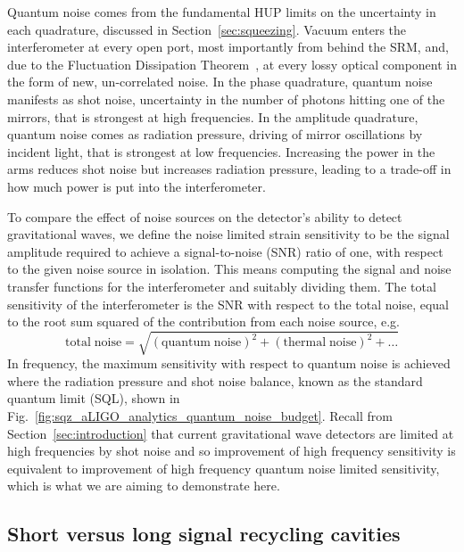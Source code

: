 \documentclass[aps,pra,superscriptaddress,reprint,nofootinbib]{revtex4-1}
\begin{document}
Quantum noise comes from the fundamental HUP limits on the uncertainty in each quadrature, discussed in Section~\ref{sec:squeezing}. Vacuum enters the interferometer at every open port, most importantly from behind the SRM, and, due to the Fluctuation Dissipation Theorem~\cite{Danilishin_2012}, at every lossy optical component in the form of new, un-correlated noise. In the phase quadrature, quantum noise manifests as shot noise, uncertainty in the number of photons hitting one of the mirrors, that is strongest at high frequencies. In the amplitude quadrature, quantum noise comes as radiation pressure, driving of mirror oscillations by incident light, that is strongest at low frequencies. Increasing the power in the arms reduces shot noise but increases radiation pressure, leading to a trade-off in how much power is put into the interferometer.


To compare the effect of noise sources on the detector’s ability to detect gravitational waves, we define the noise limited strain sensitivity to be the signal amplitude required to achieve a signal-to-noise (SNR) ratio of one, with respect to the given noise source in isolation. This means computing the signal and noise transfer functions for the interferometer and suitably dividing them. The total sensitivity of the interferometer is the SNR with respect to the total noise, equal to the root sum squared of the contribution from each noise source, e.g.\
$$\mathrm{total\; noise = \sqrt{(quantum \; noise)^2 + (thermal \; noise)^2 + \ldots}}$$
In frequency, the maximum sensitivity with respect to quantum noise is achieved where the radiation pressure and shot noise balance, known as the standard quantum limit (SQL), shown in Fig.~\ref{fig:sqz_aLIGO_analytics_quantum_noise_budget}. Recall from Section~\ref{sec:introduction} that current gravitational wave detectors are limited at high frequencies by shot noise and so improvement of high frequency sensitivity is equivalent to improvement of high frequency quantum noise limited sensitivity, which is what we are aiming to demonstrate here.


\subsection{Short versus long signal recycling cavities}
\label{sec:long_srcs}
\end{document}
